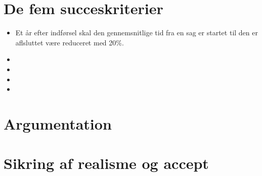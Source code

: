 \documentclass[10pt,a4paper,danish]{article}
\title{}
\author{Søren Pilgård, 190689, vpb984\\Caroline Miller, 04071979, twq135\\Rene}
\begin{document}
\maketitle
\newpage

\tableofcontents
\newpage

\section{De fem succeskriterier}

\begin{itemize}
\item Et år efter indførsel skal den gennemsnitlige tid fra en sag er startet
  til den er aflsluttet være reduceret med 20\%.
\item
\item
\item
\item
\end{itemize}

\section{Argumentation}

\section{Sikring af realisme og accept}
\end{document}
